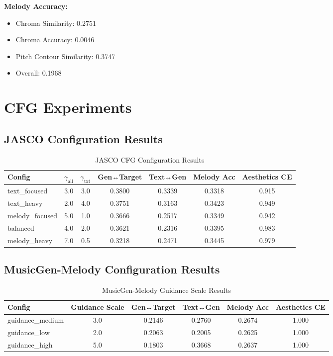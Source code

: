 \documentclass{article}
\begin{document}
\textbf{Melody Accuracy:}
\begin{itemize}
    \item Chroma Similarity: 0.2751
    \item Chroma Accuracy: 0.0046
    \item Pitch Contour Similarity: 0.3747
    \item Overall: 0.1968
\end{itemize}

\section{CFG Experiments}

\subsection{JASCO Configuration Results}

\begin{table}[h]
\centering
\caption{JASCO CFG Configuration Results}
\label{tab:jasco_cfg}
\begin{tabular}{lcccccc}
\toprule
Config & $\gamma_{\text{all}}$ & $\gamma_{\text{txt}}$ & Gen↔Target & Text↔Gen & Melody Acc & Aesthetics CE \\
\midrule
text\_focused & 3.0 & 3.0 & 0.3800 & 0.3339 & 0.3318 & 0.915 \\
text\_heavy & 2.0 & 4.0 & 0.3751 & 0.3163 & 0.3423 & 0.949 \\
melody\_focused & 5.0 & 1.0 & 0.3666 & 0.2517 & 0.3349 & 0.942 \\
balanced & 4.0 & 2.0 & 0.3621 & 0.2316 & 0.3395 & 0.983 \\
melody\_heavy & 7.0 & 0.5 & 0.3218 & 0.2471 & 0.3445 & 0.979 \\
\bottomrule
\end{tabular}
\end{table}

\subsection{MusicGen-Melody Configuration Results}

\begin{table}[h]
\centering
\caption{MusicGen-Melody Guidance Scale Results}
\label{tab:musicgen_guidance}
\begin{tabular}{lccccc}
\toprule
Config & Guidance Scale & Gen↔Target & Text↔Gen & Melody Acc & Aesthetics CE \\
\midrule
guidance\_medium & 3.0 & 0.2146 & 0.2760 & 0.2674 & 1.000 \\
guidance\_low & 2.0 & 0.2063 & 0.2005 & 0.2625 & 1.000 \\
guidance\_high & 5.0 & 0.1803 & 0.3668 & 0.2637 & 1.000 \\
\bottomrule
\end{tabular}
\end{table}
\end{document}
